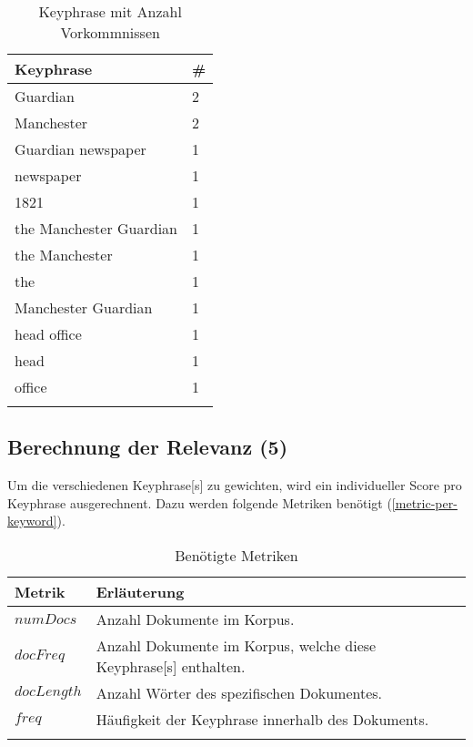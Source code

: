 \begin{longtable}{|p{4cm}| p{1cm}|}
  \hline
    \gls{Keyphrase} & \#\\\hline
    Guardian & 2  \\\hline
    Manchester & 2  \\\hline
    Guardian newspaper & 1  \\\hline
    newspaper & 1  \\\hline
    1821 & 1  \\\hline
    the Manchester Guardian & 1  \\\hline
    the Manchester & 1  \\\hline
    the & 1  \\\hline
    Manchester Guardian & 1  \\\hline
    head office & 1  \\\hline
    head & 1  \\\hline
    office & 1  \\\hline
        \caption{Keyphrase mit Anzahl Vorkommnissen}
    \label{keyword-with-count}
\end{longtable}



\subsection{Berechnung der Relevanz (5)}\label{calcrelevance}


Um die verschiedenen \gls{Keyphrase}[s] zu gewichten, wird ein individueller \gls{Score} pro \gls{Keyphrase} ausgerechnent. Dazu werden folgende Metriken benötigt (\autoref{metric-per-keyword}).

\begin{longtable}{|p{2cm}| p{8cm}|}
  \hline
    Metrik & Erläuterung\\\hline
    $numDocs$ & Anzahl Dokumente im Korpus. \\\hline
    $docFreq$ & Anzahl Dokumente im Korpus, welche diese \gls{Keyphrase}[s] enthalten. \\\hline
    $docLength$ & Anzahl Wörter des spezifischen Dokumentes. \\\hline
    $freq$ & Häufigkeit der \gls{Keyphrase} innerhalb des Dokuments. \\\hline
    \caption{Benötigte Metriken}
    \label{metric-per-keyword}
\end{longtable}


